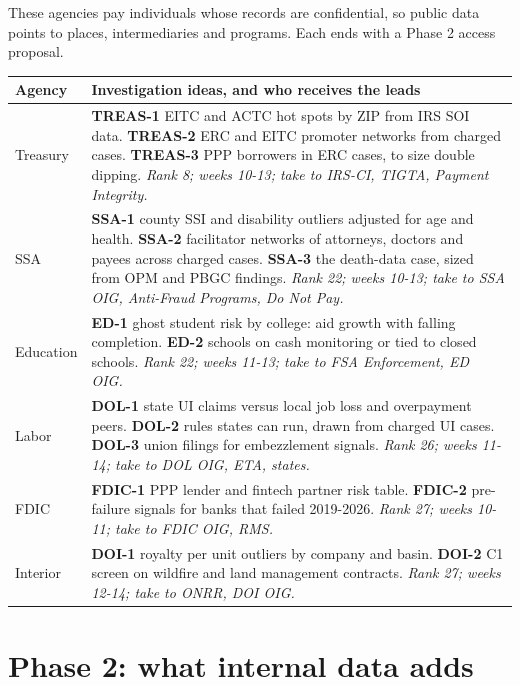 \documentclass[letterpaper,11pt]{article}
\begin{document}
These agencies pay individuals whose records are confidential, so public
data points to places, intermediaries and programs. Each ends with a
Phase 2 access proposal.

\begingroup\small\setlength{\tabcolsep}{4pt}\renewcommand{\arraystretch}{1.25}
\begin{longtable}[l]{@{}l>{\raggedright\arraybackslash}p{}@{}}
\rowcolor{coolblack}\leavevmode\color{white}\bfseries Agency & \leavevmode\color{white}\bfseries Investigation ideas, and who receives the leads \\
\endhead
Treasury & \textbf{TREAS-1} EITC and ACTC hot spots by ZIP from IRS SOI data. \textbf{TREAS-2} ERC and EITC promoter networks from charged cases. \textbf{TREAS-3} PPP borrowers in ERC cases, to size double dipping. \emph{Rank 8; weeks 10-13; take to IRS-CI, TIGTA, Payment Integrity.} \\
SSA & \textbf{SSA-1} county SSI and disability outliers adjusted for age and health. \textbf{SSA-2} facilitator networks of attorneys, doctors and payees across charged cases. \textbf{SSA-3} the death-data case, sized from OPM and PBGC findings. \emph{Rank 22; weeks 10-13; take to SSA OIG, Anti-Fraud Programs, Do Not Pay.} \\
Education & \textbf{ED-1} ghost student risk by college: aid growth with falling completion. \textbf{ED-2} schools on cash monitoring or tied to closed schools. \emph{Rank 22; weeks 11-13; take to FSA Enforcement, ED OIG.} \\
Labor & \textbf{DOL-1} state UI claims versus local job loss and overpayment peers. \textbf{DOL-2} rules states can run, drawn from charged UI cases. \textbf{DOL-3} union filings for embezzlement signals. \emph{Rank 26; weeks 11-14; take to DOL OIG, ETA, states.} \\
FDIC & \textbf{FDIC-1} PPP lender and fintech partner risk table. \textbf{FDIC-2} pre-failure signals for banks that failed 2019-2026. \emph{Rank 27; weeks 10-11; take to FDIC OIG, RMS.} \\
Interior & \textbf{DOI-1} royalty per unit outliers by company and basin. \textbf{DOI-2} C1 screen on wildfire and land management contracts. \emph{Rank 27; weeks 12-14; take to ONRR, DOI OIG.} \\
\end{longtable}\endgroup

\hypertarget{phase-2-what-internal-data-adds}{%
\section{Phase 2: what internal data
adds}\label{phase-2-what-internal-data-adds}}
\end{document}
